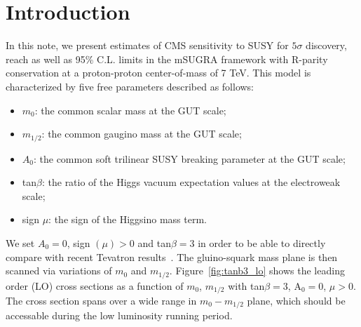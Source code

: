 \section{Introduction}
\label{sec:intro}

In this note, we present estimates of CMS sensitivity to SUSY for
$5\sigma$ discovery, reach as well as 95\% C.L. limits in the mSUGRA 
framework with R-parity conservation at a proton-proton
center-of-mass of 7 TeV. This model is characterized by five 
free parameters described as follows: 

\begin{itemize}
\item $m_{0}$: the common scalar mass at the GUT scale; 
\item $m_{1/2}$: the common gaugino mass at the GUT scale; 
\item $A_{0}$: the common soft trilinear SUSY breaking parameter at
  the GUT scale; 
\item tan$\beta$: the ratio of the Higgs vacuum expectation values at
  the electroweak scale; 
\item sign $\mu$: the sign of the Higgsino mass term. 
\end{itemize}

We set $A_{0} = 0$, sign $(\mu) > 0$ and tan$\beta = 3$ in order to be
able to directly compare with recent Tevatron
results~\cite{cdf:recentSusy, d0:recentSusy}. The gluino-squark
mass plane is then scanned  via variations of $m_{0}$ and $m_{1/2}$. 
Figure~\ref{fig:tanb3_lo} shows the leading order (LO) cross sections 
as a function of $m_{0}$, $m_{1/2}$ with tan$\beta = 3$, A$_0 = 0$, $\mu > 0$.
The cross section spans over a wide range in $m_{0}-m_{1/2}$ plane, which
should be accessable during the low luminosity running period.

